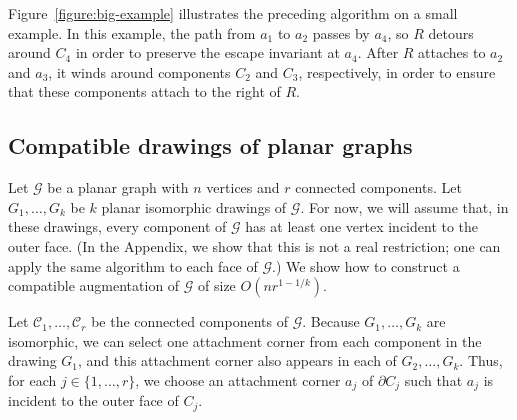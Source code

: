 \documentclass{patmorin}
\begin{document}
Figure~\ref{figure:big-example} illustrates the preceding algorithm on a small example.  In this example, the path from $a_1$ to $a_2$ passes by $a_4$, so $R$ detours around $C_4$ in order to preserve the escape invariant at $a_4$.  After $R$ attaches to $a_2$ and $a_3$, it winds around components $C_2$ and $C_3$, respectively, in order to ensure that these components attach to the right of $R$.


\subsection{Compatible drawings of planar graphs}
Let $\mathcal G$ be a planar graph with $n$ vertices and $r$ connected
components.  Let $G_1, \ldots, G_k$ be $k$ planar isomorphic drawings
of $\mathcal G$.  For now, we will assume that, in these drawings,
every component of $\mathcal G$ has at least one vertex incident to
the outer face.  (In the Appendix, we show that this is not a real
restriction; one can apply the same algorithm to each face of $\mathcal
G$.)  We show how to construct a compatible augmentation of $\mathcal G$
of size $O(nr^{1-1/k})$.

Let $\mathcal C_1, \ldots, \mathcal C_r$ be the connected components of $\mathcal G$.  Because $G_1,\ldots,G_k$ are isomorphic, we can select one attachment corner from each component in the drawing $G_1$, and this attachment corner also appears in each of $G_2,\ldots,G_k$. Thus, for each $j\in\{1,\ldots,r\}$, we choose an attachment corner $a_j$ of $\partial C_j$ such that $a_j$ is incident to the outer face of $C_j$.
\end{document}
